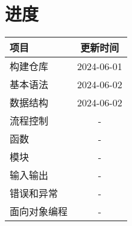 \documentclass[a4paper,12pt]{article}
\begin{document}
    \section{进度}
        \begin{table}
        \centering
            \begin{tabular}{lc}
                项目                    &   更新时间 \\
                \hline
                构建仓库                &   2024-06-01 \\
                基本语法                &   2024-06-02 \\
                数据结构                &   2024-06-02 \\
                流程控制                &   - \\
                函数                    &   - \\
                模块                    &   - \\
                输入输出                &   - \\
                错误和异常                &   - \\
                面向对象编程            &   - \\
            \end{tabular}
        \end{table}
\end{document}
